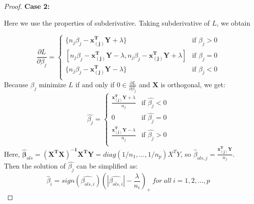 \documentclass{article}
\newtheorem{proof}{Proof}
\begin{document}
\begin{appendices}
\begin{proof}
\textbf{Case 2:}\par
Here we use the properties of subderivative. Taking subderivative of $L$, we obtain
	
\begin{equation*}
\frac{\partial L}{\partial \beta_j} = 
\begin{cases}
\{n_j\beta_j-\mathbf{x_{(j)}^TY}+\lambda\} &\mbox{if $\beta_j>0$}\\
 [n_j\beta_j-\mathbf{x_{(j)}^TY}-\lambda, n_j\beta_j-\mathbf{x_{(j)}^TY}+\lambda]&\mbox{if $\beta_j=0$}\\
\{n_j\beta_j-\mathbf{x_{(j)}^TY}-\lambda\} &\mbox{if $\beta_j<0$}\\
\end{cases}
\end{equation*}
Because $\beta_j$ minimize $L$ if and only if $0 \in \frac{\partial L}{\partial \beta_j}$ and  $\mathbf{X}$ is orthogonal, we get:
\begin{equation*}
\hat{\beta_j} = 
\begin{cases}
\frac{\mathbf{x_{(j)}^TY}+\lambda}{n_j}&\mbox{if $\hat{\beta_j}<0$}\\
0 &\mbox{if $\hat{\beta_j}=0$}\\
\frac{\mathbf{x_{(j)}^TY}-\lambda}{n_j}&\mbox{if $\hat{\beta_j}>0$}\\
\end{cases}
\end{equation*}
Here, $\bm{\hat{\beta}}_{ols} = \mathbf{(X^TX)^{-1}X^TY} = diag(1/n_1, ..., 1/n_p)X^TY$, so $\hat{\beta}_{ols,j}=\frac{\mathbf{x_{(j)}^TY}}{n_j}$. Then the solution of $\hat{\beta_j}$ can be simplified as:
\begin{equation*}
	\hat{\beta}_i = sign(\hat{\beta_{ols,i}})(|\hat{\beta_{ols,i}}|-\frac{\lambda}{n_i})_+\ for\ all\ i=1,2,...,p
\end{equation*}
\end{proof}

\end{appendices}
\end{document}

